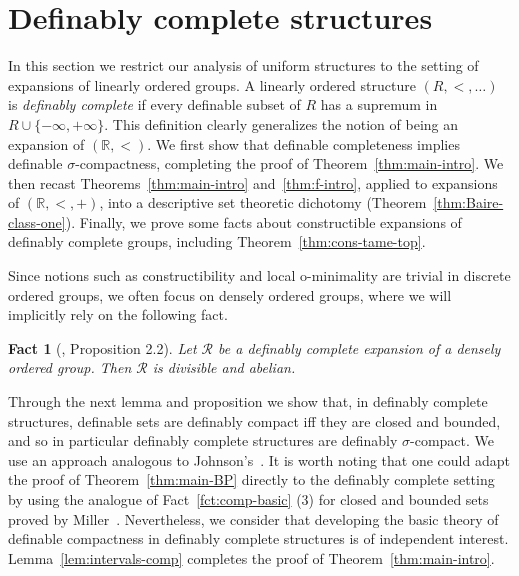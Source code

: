 \documentclass[12pt]{article}
\newcommand{\Rr}{\mathcal{R}}
\newcommand{\R}{\mathbb{R}}
\newtheorem{fact}[theorem]{Fact}
\theoremstyle{definition}
\theoremstyle{remark}
\begin{document}
\section{Definably complete structures}\label{sec:LO-structures}

In this section we restrict our analysis of uniform structures to the setting of expansions of linearly ordered groups. A linearly ordered structure $(R,<,\ldots)$ is \emph{definably complete} if every definable subset of $R$ has a supremum in $R \cup \{-\infty, +\infty\}$. This definition clearly generalizes the notion of being an expansion of $(\R,<)$. We first show that definable completeness implies definable $\sigma$-compactness, completing the proof of Theorem~\ref{thm:main-intro}. We then recast Theorems~\ref{thm:main-intro} and~\ref{thm:f-intro}, applied to expansions of $(\R,<,+)$, into a descriptive set theoretic dichotomy (Theorem~\ref{thm:Baire-class-one}). Finally, we prove some facts about constructible expansions of definably complete groups, including Theorem~\ref{thm:cons-tame-top}.

Since notions such as constructibility and local o-minimality are trivial in discrete ordered groups, we often focus on densely ordered groups, where we will implicitly rely on the following fact. 

\begin{fact}[\cite{MillerIVP}, Proposition 2.2] \label{fct:DC-doag}
Let $\Rr$ be a definably complete expansion of a densely ordered group. Then $\Rr$ is divisible and abelian. 
\end{fact}

Through the next lemma and proposition we show that, in definably complete structures, definable sets are definably compact iff they are closed and bounded, and so in particular definably complete structures are definably $\sigma$-compact. We use an approach analogous to Johnson's~\cite{johnson14}. It is worth noting that one could adapt the proof of Theorem~\ref{thm:main-BP} directly to the definably complete setting by using the analogue of Fact~\ref{fct:comp-basic} (3) for closed and bounded sets proved by Miller~\cite{MillerIVP}. Nevertheless, we consider that developing the basic theory of definable compactness in definably complete structures is of independent interest. Lemma~\ref{lem:intervals-comp} completes the proof of Theorem~\ref{thm:main-intro}.
\end{document}
